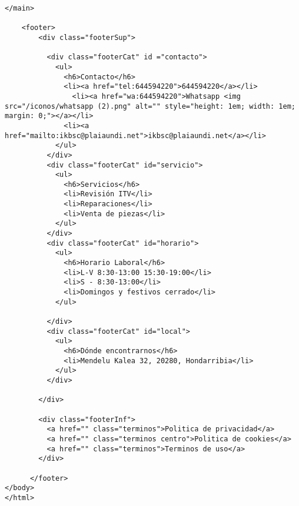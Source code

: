 \begin{lstlisting}[caption=Productos.html (LMSI)]
    </main>
    
    <footer>
        <div class="footerSup">
  
          <div class="footerCat" id ="contacto">
            <ul>
              <h6>Contacto</h6>
              <li><a href="tel:644594220">644594220</a></li>
                <li><a href="wa:644594220">Whatsapp <img src="/iconos/whatsapp (2).png" alt="" style="height: 1em; width: 1em; margin: 0;"></a></li>
              <li><a href="mailto:ikbsc@plaiaundi.net">ikbsc@plaiaundi.net</a></li>
            </ul>
          </div>
          <div class="footerCat" id="servicio">
            <ul>
              <h6>Servicios</h6>
              <li>Revisión ITV</li>
              <li>Reparaciones</li>
              <li>Venta de piezas</li>
            </ul>
          </div>
          <div class="footerCat" id="horario">
            <ul>
              <h6>Horario Laboral</h6>
              <li>L-V 8:30-13:00 15:30-19:00</li>
              <li>S - 8:30-13:00</li>
              <li>Domingos y festivos cerrado</li>
            </ul>
  
          </div>
          <div class="footerCat" id="local">
            <ul>
              <h6>Dónde encontrarnos</h6>
              <li>Mendelu Kalea 32, 20280, Hondarribia</li>
            </ul>
          </div>
  
        </div>
        
        <div class="footerInf">
          <a href="" class="terminos">Politica de privacidad</a>
          <a href="" class="terminos centro">Politica de cookies</a>
          <a href="" class="terminos">Terminos de uso</a>
        </div>
          
      </footer>
</body>
</html>
\end{lstlisting}
\clearpage
